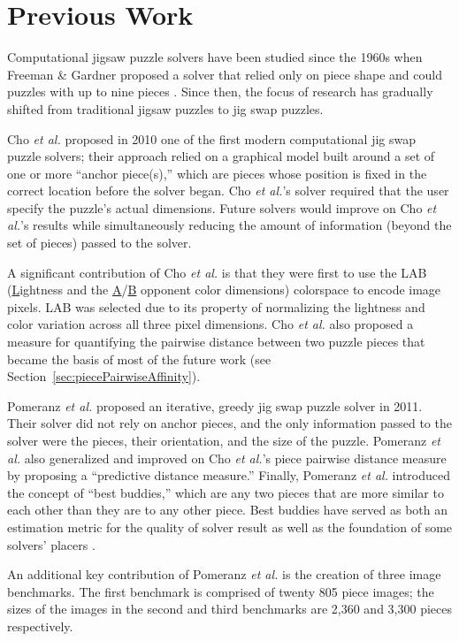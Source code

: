 \chapter{Previous Work}\label{chap:previous_work}

Computational jigsaw puzzle solvers have been studied since the 1960s when Freeman \& Gardner proposed a solver that relied only on piece shape and could puzzles with up to nine pieces \cite{freeman1964}.  Since then, the focus of research has gradually shifted from traditional jigsaw puzzles to jig swap puzzles.  

Cho \textit{et al.} \cite{cho2010} proposed in 2010 one of the first modern computational jig swap puzzle solvers; their approach relied on a graphical model built around a set of one or more ``anchor piece(s),'' which are pieces whose position is fixed in the correct location before the solver began.  Cho \textit{et al.}'s solver required that the user specify the puzzle's actual dimensions.  Future solvers would improve on Cho \textit{et al.}'s results while simultaneously reducing the amount of information (beyond the set of pieces) passed to the solver.

A significant contribution of Cho \textit{et al.} is that they were first to use the LAB  (\underline{L}ightness and the \underline{A}/\underline{B} opponent color dimensions) colorspace to encode image pixels.  LAB was selected due to its property of normalizing the lightness and color variation across all three pixel dimensions.  Cho \textit{et al.} also proposed a measure for quantifying the pairwise distance between two puzzle pieces that became the basis of most of the future work (see Section~\ref{sec:piecePairwiseAffinity}).  

Pomeranz \textit{et al.} \cite{pomeranz2011} proposed an iterative, greedy jig swap puzzle solver in 2011.  Their solver did not rely on anchor pieces, and the only information passed to the solver were the pieces, their orientation, and the size of the puzzle.  Pomeranz \textit{et al.} also generalized and improved on Cho \textit{et al.}'s piece pairwise distance measure by proposing a ``predictive distance measure.''  Finally, Pomeranz \textit{et al.} introduced the concept of ``best buddies,'' which are any two pieces that are more similar to each other than they are to any other piece.  Best buddies have served as both an estimation metric for the quality of solver result as well as the foundation of some solvers' placers \cite{paikin2015}.

An additional key contribution of Pomeranz \textit{et al.} is the creation of three image benchmarks.  The first benchmark is comprised of twenty 805 piece images; the sizes of the images in the second and third benchmarks are 2,360 and 3,300 pieces respectively.

